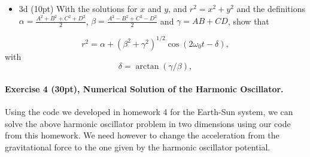 \documentclass[%
oneside,                 %
final,                   %
10pt]{article}
\begin{document}
\begin{itemize}
\item 3d (10pt) With the solutions for $x$ and $y$, and $r^2=x^2+y^2$ and the definitions $\alpha=\frac{A^2+B^2+C^2+D^2}{2}$, $\beta=\frac{A^2-B^2+C^2-D^2}{2}$ and $\gamma=AB+CD$, show that
\end{itemize}

\noindent
\[
r^2=\alpha+(\beta^2+\gamma^2)^{1/2}\cos(2\omega_0 t-\delta),
\]
with
\[
\delta=\arctan(\gamma/\beta),
\]


\paragraph{Exercise 4 (30pt), Numerical Solution of the Harmonic Oscillator.}
Using the code we developed in homework 4 for the Earth-Sun system, we can solve the above harmonic oscillator problem in two dimensions using our code from this homework. We need however to change the acceleration from the gravitational force to the one given by the harmonic oscillator potential.
\end{document}
